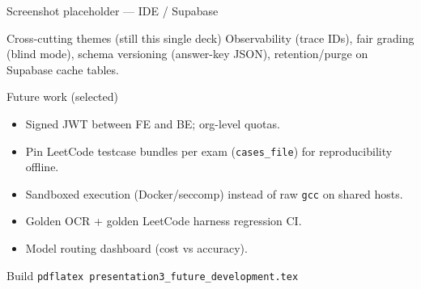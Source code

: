 \documentclass[aspectratio=169]{beamer}
\begin{document}
\begin{frame}{Screenshot placeholder --- IDE / Supabase}
  \begin{center}
  \end{center}
\end{frame}

\begin{frame}{Cross-cutting themes (still this single deck)}
  \small
  Observability (trace IDs), fair grading (blind mode), schema versioning (answer-key JSON), retention/purge on Supabase cache tables.
\end{frame}

\begin{frame}{Future work (selected)}
  \small
  \begin{itemize}
    \item Signed JWT between FE and BE; org-level quotas.
    \item Pin LeetCode testcase bundles per exam (\texttt{cases\_file}) for reproducibility offline.
    \item Sandboxed execution (Docker/seccomp) instead of raw \texttt{gcc} on shared hosts.
    \item Golden OCR + golden LeetCode harness regression CI.
    \item Model routing dashboard (cost vs accuracy).
  \end{itemize}
\end{frame}

\begin{frame}{Build}
  \centering
  \texttt{pdflatex presentation3\_future\_development.tex}
\end{frame}
\end{document}
